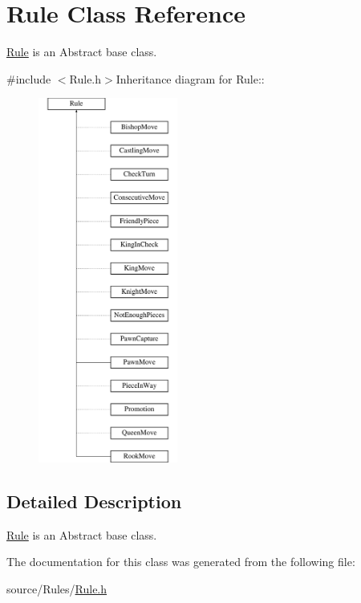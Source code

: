 \hypertarget{classRule}{
\section{Rule Class Reference}
\label{classRule}
}


\hyperlink{classRule}{Rule} is an Abstract base class.  


{\ttfamily \#include $<$Rule.h$>$}Inheritance diagram for Rule::\begin{figure}[H]
\begin{center}
\leavevmode
\includegraphics[height=12cm]{classRule}
\end{center}
\end{figure}


\subsection{Detailed Description}
\hyperlink{classRule}{Rule} is an Abstract base class. 

The documentation for this class was generated from the following file:\begin{DoxyCompactItemize}
\item 
source/Rules/\hyperlink{Rule_8h}{Rule.h}\end{DoxyCompactItemize}
